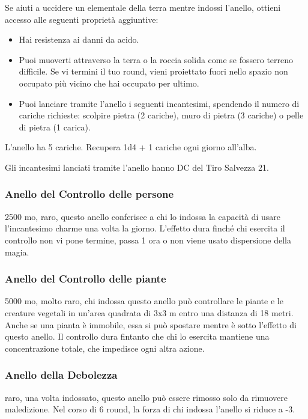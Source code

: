 \begin{multicols}{2}
	Se aiuti a uccidere un elementale della terra mentre indossi l'anello, ottieni accesso alle seguenti proprietà aggiuntive:

	\medskip

	\begin{itemize}
		\item
		Hai resistenza ai danni da acido.
		\item
		Puoi muoverti attraverso la terra o la roccia solida come se fossero terreno difficile. Se vi termini il tuo round, vieni proiettato fuori nello spazio non occupato più vicino che hai occupato per ultimo.
		\item
		Puoi lanciare tramite l'anello i seguenti incantesimi, spendendo il numero di cariche richieste: scolpire pietra (2 cariche), muro di pietra (3 cariche) o pelle di pietra (1 carica).
	\end{itemize}

	\medskip

	L'anello ha 5 cariche. Recupera 1d4 + 1 cariche ogni giorno all'alba.

	Gli incantesimi lanciati tramite l'anello hanno DC del Tiro Salvezza 21.

	\subsubsection*{Anello del Controllo delle persone}
	2500 mo, raro, questo anello conferisce a chi lo indossa la capacità di usare l'incantesimo charme una volta la giorno. L'effetto dura finché chi esercita il controllo non vi pone termine, passa 1 ora o non viene usato dispersione della magia.

	\subsubsection*{Anello del Controllo delle piante}
	5000 mo, molto raro, chi indossa questo anello può controllare le piante e le creature vegetali in un’area quadrata di 3x3 m entro una distanza di 18 metri. Anche se una pianta è immobile, essa si può spostare mentre è sotto l’effetto di questo anello. Il controllo dura fintanto che chi lo esercita mantiene una concentrazione totale, che impedisce ogni altra azione.

	\subsubsection*{Anello della Debolezza}
	raro, una volta indossato, questo anello può essere rimosso solo da rimuovere maledizione. Nel corso di 6 round, la forza di chi indossa l’anello si riduce a -3.


\end{multicols}
